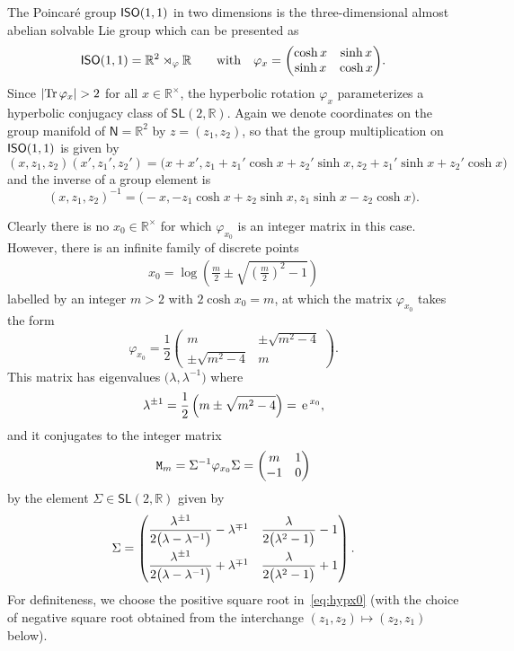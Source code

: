 \documentclass[pdftex]{sigma}
\numberwithin{equation}{section}
\newcommand{\sfN}{\mathsf{N}}
\newcommand{\sfSL}{\mathsf{SL}}
\newcommand{\ISO}{{\sf ISO}}
\newcommand{\real}{{\mathbb R}} %
\newcommand{\Tr}[1]{{\rm Tr}\,#1}
\def\e{{\,\rm e}\,}
\begin{document}
The Poincar\'e group $\ISO(1,1)$ in two dimensions is the
three-dimensional almost abelian solvable Lie group which can be presented as
\[
\ISO(1,1) = \real^2\rtimes_\varphi\real \qquad \mbox{with} \quad
\varphi_x = \bigg(\begin{matrix} \cosh x & \sinh x \\ \sinh x &
 \cosh x \end{matrix}\bigg) .
\]
Since $|\Tr\varphi_x|>2$ for all $x\in\real^\times$, the hyperbolic rotation
$\varphi_x$ parameterizes a hyperbolic conjugacy class of
$\sfSL(2,\real)$. Again we denote coordinates on the group
manifold of $\sfN=\real^2$
by $z=(z_1,z_2)$, so that the group multiplication on
$\ISO(1,1)$ is given by
\[
(x,z_1,z_2) (x',z_1',z_2') = \big(x+x' , z_1+z_1'\cosh
x+z_2'\sinh x ,
z_2+z_1'\sinh x+z_2'\cosh x\big)
\]
and the inverse of a group element is
\[
(x,z_1,z_2)^{-1} = \big({-}x , -z_1\cosh x+z_2\sinh x , z_1\sinh
x-z_2\cosh x\big) .
\]

Clearly there is no $x_0\in\real^\times$ for which $\varphi_{x_0}$ is
an integer matrix in this case. However, there is an infinite family of discrete points
\begin{gather}\label{eq:hypx0}
x_0 = \log\left(\frac m2 \pm \sqrt{\left(\frac m2\right)^2-1}\right)
\end{gather}
labelled by an integer $m>2$ with $2\cosh x_0=m$, at which
the matrix $\varphi_{x_0}$ takes the form
\[
\varphi_{x_0} = \frac12 \left(\begin{matrix} m & \pm \sqrt{m^2-4}
 \\ \pm \sqrt{m^2-4} &
 m \end{matrix}\right) .
\]
This matrix has eigenvalues $\big(\lambda,\lambda^{-1}\big)$ where
\[
\lambda^{\pm1} = \frac12 \left(m\pm\sqrt{m^2-4}\right) = \e^{x_0} ,
\]
and it conjugates to the integer matrix
\begin{gather}\label{eq:monhyp}
{\tt M}_m = \Sigma^{-1} \varphi_{x_0} \Sigma =
\left(\begin{matrix} m & 1 \\ -1 & 0 \end{matrix}\right)
\end{gather}
by the element $\Sigma\in\sfSL(2,\real)$ given by
\begin{gather}\label{eq:hypSigma}
\Sigma = \begin{pmatrix} \dfrac{\lambda^{\pm1}}{2 \big(\lambda-\lambda^{-1}\big)} - \lambda^{\mp1} & \dfrac\lambda{2 \big(\lambda^2-1\big)}-1 \vspace{1mm}\\ \dfrac{\lambda^{\pm1}}{2 \big(\lambda-\lambda^{-1}\big)} + \lambda^{\mp1} &
 \dfrac\lambda{2 \big(\lambda^2-1\big)} + 1 \end{pmatrix} .
\end{gather}
For definiteness, we choose the positive square root in~\eqref{eq:hypx0} (with the choice of negative square root obtained
from the interchange $(z_1,z_2)\mapsto(z_2,z_1)$ below).
\end{document}
